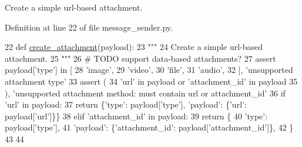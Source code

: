 \begin{DoxyVerb}Create a simple url-based attachment.
\end{DoxyVerb}
 

Definition at line 22 of file message\+\_\+sender.\+py.


\begin{DoxyCode}
22 \textcolor{keyword}{def }\hyperlink{namespaceparlai_1_1chat__service_1_1services_1_1messenger_1_1message__sender_a8303c44a600b84c0d42770128be13e9a}{create\_attachment}(payload):
23     \textcolor{stringliteral}{"""}
24 \textcolor{stringliteral}{    Create a simple url-based attachment.}
25 \textcolor{stringliteral}{    """}
26     \textcolor{comment}{# TODO support data-based attachments?}
27     \textcolor{keyword}{assert} payload[\textcolor{stringliteral}{'type'}] \textcolor{keywordflow}{in} [
28         \textcolor{stringliteral}{'image'},
29         \textcolor{stringliteral}{'video'},
30         \textcolor{stringliteral}{'file'},
31         \textcolor{stringliteral}{'audio'},
32     ], \textcolor{stringliteral}{'unsupported attachment type'}
33     \textcolor{keyword}{assert} (
34         \textcolor{stringliteral}{'url'} \textcolor{keywordflow}{in} payload \textcolor{keywordflow}{or} \textcolor{stringliteral}{'attachment\_id'} \textcolor{keywordflow}{in} payload
35     ), \textcolor{stringliteral}{'unsupported attachment method: must contain url or attachment\_id'}
36     \textcolor{keywordflow}{if} \textcolor{stringliteral}{'url'} \textcolor{keywordflow}{in} payload:
37         \textcolor{keywordflow}{return} \{\textcolor{stringliteral}{'type'}: payload[\textcolor{stringliteral}{'type'}], \textcolor{stringliteral}{'payload'}: \{\textcolor{stringliteral}{'url'}: payload[\textcolor{stringliteral}{'url'}]\}\}
38     \textcolor{keywordflow}{elif} \textcolor{stringliteral}{'attachment\_id'} \textcolor{keywordflow}{in} payload:
39         \textcolor{keywordflow}{return} \{
40             \textcolor{stringliteral}{'type'}: payload[\textcolor{stringliteral}{'type'}],
41             \textcolor{stringliteral}{'payload'}: \{\textcolor{stringliteral}{'attachment\_id'}: payload[\textcolor{stringliteral}{'attachment\_id'}]\},
42         \}
43 
44 
\end{DoxyCode}
\mbox{\label{namespaceparlai_1_1chat__service_1_1services_1_1messenger_1_1message__sender_a2b2d0c5879079ba1320a7ed62893d7de}} 
